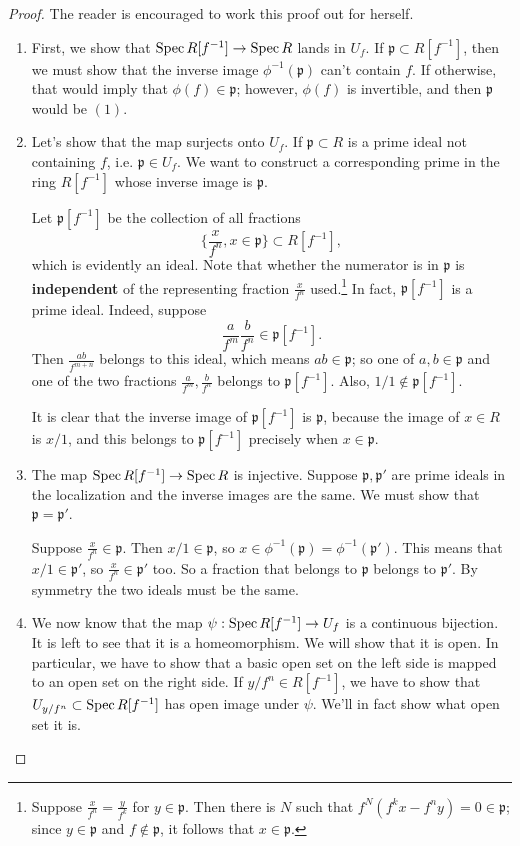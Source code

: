 \begin{proof}
The reader is encouraged to work this proof out for herself.

\begin{enumerate}
\item 
First, we show that $\operatorname{Spec} R[f^{-1}] \to \operatorname{Spec} R$ lands in
$U_f$. If
$\mathfrak{p} \subset R[f^{-1}]$, then we must show that the
inverse image
$\phi^{-1}(\mathfrak{p})$ can't contain $f$. If otherwise, that
would imply that
$\phi(f) \in \mathfrak{p}$; however, $\phi(f)$ is invertible,
and then
$\mathfrak{p}$ would be $(1)$.  
\item Let's show that the map surjects onto $U_f$. If
$\mathfrak{p} \subset R$ is a prime
ideal not containing $f$, i.e. $\mathfrak{p} \in U_f$. We want
to construct a
corresponding prime in the ring $R[f^{-1}]$ whose inverse image
is $\mathfrak{p}$.

Let $\mathfrak{p}[f^{-1}]$ be the collection of all fractions
\[ \{\frac{x}{f^n}, x \in \mathfrak{p}\} \subset R[f^{-1}],  \]
which is evidently an ideal. Note that whether the numerator is
in
$\mathfrak{p}$ is \textbf{independent} of the
representing fraction $\frac{x}{f^n}$ used.\footnote{Suppose
$\frac{x}{f^n} =
\frac{y}{f^k}$ for $y \in \mathfrak{p}$. Then there is $N$ such
that
$f^N(f^k x - f^n y) = 0 \in \mathfrak{p}$; since $y \in
\mathfrak{p}$ and $f
\notin \mathfrak{p}$, it follows that $x \in \mathfrak{p}$.}
In fact, $\mathfrak{p}[f^{-1}]$ is a prime ideal. Indeed,
suppose
\[  \frac{a}{f^m} \frac{b}{f^n} \in \mathfrak{p}[f^{-1}] .\]
Then $\frac{ab}{f^{m+n}}$ belongs to this ideal, which means $ab
\in
\mathfrak{p}$; so one of $a,b \in \mathfrak{p}$ and one of the
two fractions
$\frac{a}{f^m}, \frac{b}{f^n}$ belongs to
$\mathfrak{p}[f^{-1}]$. Also, $1/1
\notin \mathfrak{p}[f^{-1}]$.

It is clear that the inverse image of $\mathfrak{p}[f^{-1}]$ is
$\mathfrak{p}$,
because the image of $x \in R$ is $x/1$, and this belongs to
$\mathfrak{p}[f^{-1}]$ precisely when $x \in \mathfrak{p}$.
\item The map $\operatorname{Spec} R[f^{-1}] \to \operatorname{Spec} R$ is injective.
Suppose
$\mathfrak{p}, \mathfrak{p'}$ are prime ideals in the
localization and the
inverse images are the same.  
We must show that $\mathfrak{p} = \mathfrak{p'}$.

Suppose $\frac{x}{f^n} \in \mathfrak{p}$. Then $x/1 \in
\mathfrak{p}$, so $x
\in \phi^{-1}(\mathfrak{p}) = \phi^{-1}(\mathfrak{p}')$. This
means that $x/1
\in \mathfrak{p}'$, so 
$\frac{x}{f^n} \in \mathfrak{p}'$ too. So a fraction that
belongs to
$\mathfrak{p}$ belongs to $\mathfrak{p}'$. By symmetry the two
ideals must be
the same.  
\item We now know that the map $\psi: \operatorname{Spec} R[f^{-1}] \to U_f$
is a continuous
bijection. It is left to see that it is a homeomorphism. We will
show that it
is open.  
In particular, we have to show that a basic open set on the left
side is mapped
to an open set on the right side.
If $y/f^n \in R[f^{-1}]$, we have to show that $U_{y/f^n}
\subset \operatorname{Spec}
R[f^{-1}]$ has open image under $\psi$. We'll in fact show what
open set it is.


\end{enumerate}
\end{proof}
